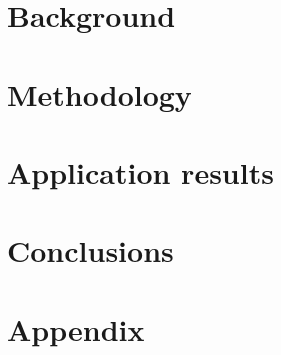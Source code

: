 \documentclass[oneside,openright,titlepage,numbers=noenddot,headinclude,%
                footinclude=true,cleardoublepage=empty,abstract=on,%
                paper=a4,fontsize=11pt]{scrreprt}
\begin{document}
\frenchspacing
\raggedbottom
{}
\pagestyle{plain}


\cleardoublepage
\cleardoublepage
\cleardoublepage
\cleardoublepage

\cleardoublepage
\pagestyle{scrheadings}

\cleardoublepage
\part{Background}\label{pt:part1}
\cleardoublepage

\part{Methodology}\label{pt:part2}
\cleardoublepage
\cleardoublepage

\part{Application results}\label{pt:part3}
\cleardoublepage
\cleardoublepage
\cleardoublepage
\cleardoublepage
\cleardoublepage

\part{Conclusions}\label{pt:part4}
\cleardoublepage

\appendix
\cleardoublepage
\part{Appendix}\label{pt:part5}
\cleardoublepage



\end{document}
